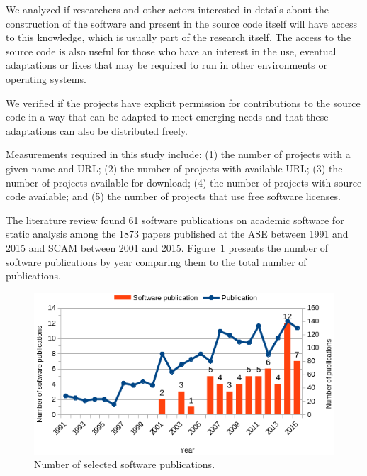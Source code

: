 \noindent \StudyOneQuestionThree We analyzed if researchers and other
actors interested in details about the construction of the software and present
in the source code itself will have access to this knowledge, which is usually
part of the research itself. The access to the source code is also useful for
those who have an interest in the use, eventual adaptations or fixes that may
be required to run in other environments or operating systems.

\noindent \StudyOneQuestionFour We verified if the projects have
explicit permission for contributions to the source code in a way that can be
adapted to meet emerging needs and that these adaptations can also be
distributed freely.

Measurements required in this study include:
(1) the number of projects with a given name and URL;
(2) the number of projects with available URL;
(3) the number of projects available for download;
(4) the number of projects with source code available; and
(5) the number of projects that use free software licenses.

%
The literature review found 61 software publications
on academic software for static analysis
among the 1873 papers published at the ASE between 1991 and 2015 and SCAM between 2001 and 2015.
Figure~\ref{papers-and-tool-papers-selected-by-year}
presents the number of software publications by year
comparing them to the total number of publications.

\begin{figure}[ht]
  \center
  \includegraphics[scale=0.6]{figs/papers-and-tool-papers-selected-by-year-2axis.png}
  \caption{Number of selected software publications.}
  \label{papers-and-tool-papers-selected-by-year}
\end{figure}


